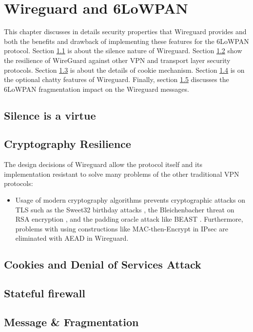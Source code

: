 \chapter{Wireguard and 6LoWPAN}
  This chapter discusses in details security properties that Wireguard provides and both the benefits
  and drawback of implementing these features for the 6LoWPAN protocol. Section \ref{iot:silence} is
  about the silence nature of Wireguard. Section \ref{iot:crypt} show the resilience of WireGuard
  against other VPN and transport layer security protocols. Section \ref{iot:cookie} is about the details of 
  cookie mechanism. Section \ref{iot:perist} is on the optional chatty features of Wireguard.
  Finally, section \ref{iot:mem} discusses the 6LoWPAN fragmentation impact on the Wireguard messages.
\section{Silence is a virtue} \label{iot:silence}
\section{Cryptography Resilience} \label{iot:crypt}
  The design decisions of Wireguard allow the protocol itself and its implementation resistant to
  solve many problems of the other traditional VPN protocols:
  \begin{itemize}
    \item Usage of modern cryptography algorithms prevents cryptographic attacks on TLS
    such as the Sweet32 birthday attacks \cite{sweet32}, the Bleichenbacher threat on RSA encryption \cite{bleichen}, 
    and the padding oracle attack like BEAST \cite{beast}.  Furthermore, problems with using
    constructions like MAC-then-Encrypt in IPsec \cite{ipsec_conf} are eliminated with AEAD in Wireguard.
  \end{itemize}
\section{Cookies and Denial of Services Attack} \label{iot:cookie}
\section{Stateful firewall} \label{iot:perist}
\section{Message \& Fragmentation} \label{iot:mem}
